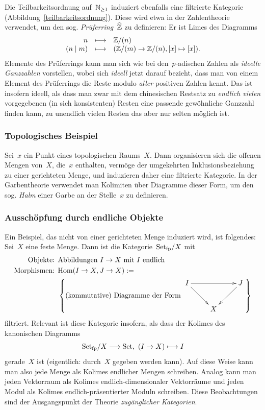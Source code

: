 Die Teilbarkeitsordnung auf~$\mathbb{N}_{\geq 1}$ induziert ebenfalls eine
filtrierte Kategorie (Abbildung~\ref{teilbarkeitsordnung}). Diese wird etwa
in der Zahlentheorie verwendet, um den sog. \emph{Prüferring}~$\widehat{\mathbb{Z}}$ zu
definieren: Er ist Limes des Diagramms
\[ \begin{array}{@{}rcl@{}}
  n &\longmapsto& \ZZ/(n) \\
  (n \mid m) &\longmapsto& (\ZZ/(m) \to \ZZ/(n), [x] \mapsto [x]).
\end{array} \]
Elemente des Prüferrings kann man sich wie bei den~$p$-adischen Zahlen als
\emph{ideelle Ganzzahlen} vorstellen, wobei sich \emph{ideell} jetzt darauf
bezieht, dass man von einem Element des Prüferrings die Reste modulo
\emph{aller} positiven Zahlen kennt. Das ist insofern ideell, als dass man zwar
mit dem chinesischen Restsatz zu \emph{endlich vielen} vorgegebenen (in sich
konsistenten) Resten eine passende gewöhnliche Ganzzahl finden kann, zu
unendlich vielen Resten das aber nur selten möglich ist.


\subsubsection*{Topologisches Beispiel}

Sei~$x$ ein Punkt eines topologischen Raums~$X$. Dann organisieren sich
die offenen Mengen von~$X$, die~$x$ enthalten, vermöge der umgekehrten
Inklusionsbeziehung zu einer gerichteten Menge, und induzieren daher eine
filtrierte Kategorie. In der Garbentheorie verwendet man Kolimiten über
Diagramme dieser Form, um den sog. \emph{Halm} einer Garbe an der Stelle~$x$ zu
definieren.


\subsubsection*{Ausschöpfung durch endliche Objekte}

Ein Beispiel, das nicht von einer gerichteten Menge induziert wird, ist
folgendes: Sei~$X$ eine feste Menge. Dann ist die Kategorie~$\mathrm{Set}_\mathrm{fp}/X$ mit
\begin{align*}
  \text{Objekte: } & \text{Abbildungen $I \to X$ mit $I$ endlich} \\
  \text{Morphismen: } &
    \Hom(I \to X, J \to X) := \\ & \left\{
    \text{(kommutative) Diagramme der Form $\vcenter{\xymatrix{
       I \ar[rr] \ar[dr] & & J \ar[ld] \\
       & X
      }}$} \right\}
\end{align*}
filtriert. Relevant ist diese Kategorie insofern, als dass der Kolimes des
kanonischen Diagramms
\[ \mathrm{Set}_\mathrm{fp}/X \longrightarrow \mathrm{Set},\ (I \to X) \longmapsto I \]
gerade~$X$ ist (eigentlich: durch~$X$ gegeben werden kann). Auf diese Weise
kann man also jede Menge als Kolimes endlicher Mengen schreiben.
Analog kann man jeden Vektorraum als Kolimes endlich-dimensionaler Vektorräume
und jeden Modul als Kolimes endlich-präsentierter Moduln schreiben. Diese
Beobachtungen sind der Ausgangspunkt der Theorie \emph{zugänglicher Kategorien}.


